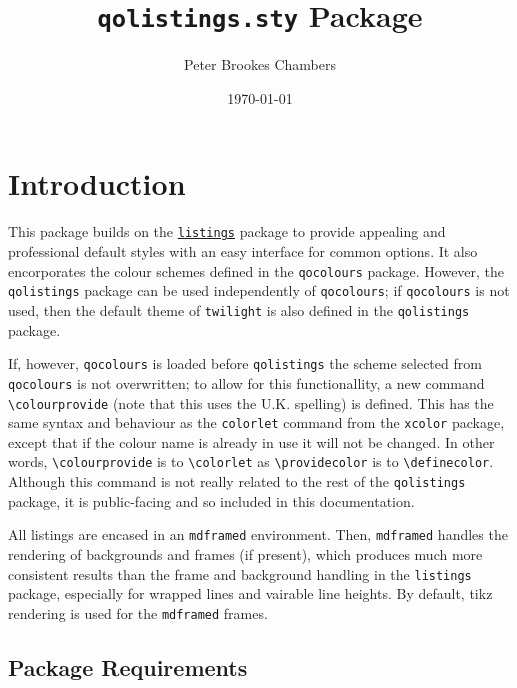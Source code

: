 \documentclass{article}
\title{\texttt{qolistings.sty} Package}
\author{Peter Brookes Chambers}
\date{\today{}}
\newcommand{\ttt}[1]{\texttt{#1}}
\begin{document}
\maketitle
\clearpage
\tableofcontents{}
\clearpage
{}
\section{Introduction}

This package builds on the \href{https://ctan.math.illinois.edu/macros/latex/contrib/listings/listings.pdf}{\texttt{listings}} package to provide appealing and professional default styles with an easy interface for common options. It also encorporates the colour schemes defined in the \texttt{qocolours} package. However, the \texttt{qolistings} package can be used independently of \texttt{qocolours}; if \texttt{qocolours} is not used, then the default theme of \texttt{twilight} is also defined in the \ttt{qolistings} package.

If, however, \ttt{qocolours} is loaded before \ttt{qolistings} the scheme selected from \ttt{qocolours} is not overwritten; to allow for this functionallity, a new command \verb|\colourprovide| (note that this uses the U.K. spelling) is defined. This has the same syntax and behaviour as the  \verb|colorlet| command from the \ttt{xcolor} package, except that if the colour name is already in use it will not be changed. In other words, \verb|\colourprovide| is to \verb|\colorlet| as \verb|\providecolor| is to \verb|\definecolor|. Although this command is not really related to the rest of the \ttt{qolistings} package, it is public-facing and so included in this documentation.

All listings are encased in an \texttt{mdframed} environment. Then, \ttt{mdframed} handles the rendering of backgrounds and frames (if present), which produces much more consistent results than the frame and background handling in the \ttt{listings} package, especially for wrapped lines and vairable line heights. By default, tikz rendering is used for the \ttt{mdframed} frames.

\subsection{Package Requirements}
\end{document}
